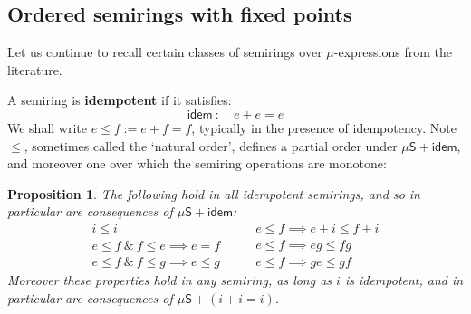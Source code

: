 \documentclass[a4paper,10pt]{amsart}
\newcommand{\defname}[1]{\textbf{{#1}}}
\newcommand{\df}{:=}
\newtheorem{proposition}[theorem]{Proposition}
\theoremstyle{definition}
\newcommand{\basicax}{\mu\mathsf{S}}
\newcommand{\idem}{\mathsf{idem}}
\begin{document}
\subsection{Ordered semirings with fixed points}
Let us continue to recall certain classes of semirings over $\mu$-expressions from the literature.

    A semiring is \defname{idempotent} if it satisfies:
    \[
    \idem\ : \quad  e + e = e
    \]
We shall write $e\leq f \df e+f = f$,
typically in the presence of idempotency.
Note $\leq$, sometimes called the `natural order', defines a partial order under $\basicax + \idem$, and moreover one over which the semiring operations are monotone:

\begin{proposition}
\label{props-of-nat-order}
    The following hold in all idempotent semirings, and so in particular are consequences of $\basicax + \idem$:
\begin{equation}
    \label{eq:mon-po}
    \begin{array}{c}
     i\leq i \\
     e \leq f \  \& \ f \leq e \implies e = f \\
     e \leq f \ \& \  f \leq g \implies e \leq g
\end{array}
\qquad
\begin{array}{l}
e\leq f \implies e+i \leq f+i \\ 
e\leq f \implies eg \leq fg \\
e \leq f \implies ge \leq gf
\end{array}
\end{equation}
Moreover these properties hold in \emph{any} semiring, as long as $i$ is idempotent, and in particular are consequences of $\basicax + (i+i=i)$.
\end{proposition}
\end{document}
